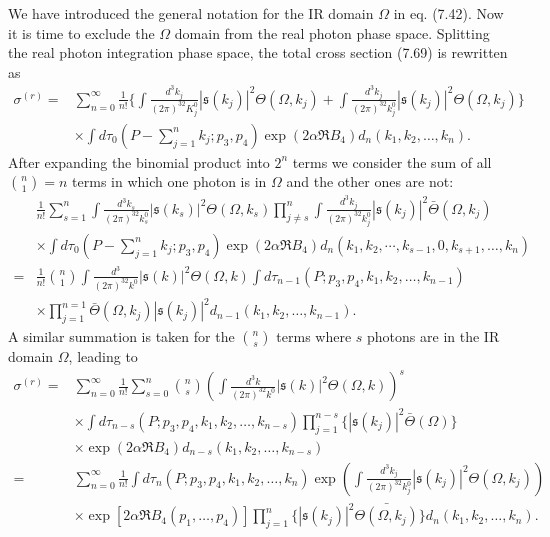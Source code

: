 We have introduced the general notation for the IR domain $\Omega$ in eq. (7.42). Now it is time to exclude the $\Omega$ domain from the real photon phase space. Splitting the real photon integration phase space, the total cross section (7.69) is rewritten as
\begin{align}
\sigma^{(r)}=&\sum_{n=0}^{\infty}\frac{1}{n!}\biggl\{ \int\frac{d^3k_j}{(2\pi)^32K_j^0}|\mathfrak{s}(k_j)|^2\Theta(\Omega,k_j)+\int\frac{d^3 k_j}{(2\pi)^32k_j^0}|\mathfrak{s}(k_j)|^2\Theta(\Omega,k_j) \biggr\}\nonumber\\
&\times\int d\tau_0\left( P-\sum^n_{j=1}k_j;p_3,p_4 \right)\exp(2\alpha\Re B_4)d_n(k_1,k_2,\ldots,k_n).
\end{align}
After expanding the binomial product into $2^n$ terms we consider the sum of all $\binom{n}{1}=n$ terms in which one photon is in $\Omega$ and the other ones are not:
\begin{align}
&\frac{1}{n!}\sum_{s=1}^{n}\int\frac{d^3k_s}{(2\pi)^32k_s^0}|\mathfrak{s}(k_s)|^2\Theta(\Omega,k_s)\prod_{j\neq s}^{n}\int\frac{d^3k_j}{(2\pi)^32k^0_j}|\mathfrak{s}(k_j)|^2\bar{\Theta}(\Omega,k_j)\nonumber\\
&\times\int d\tau_0\left( P-\sum_{j=1}^{n}k_j;p_3,p_4 \right)\exp(2\alpha\Re B_4)d_n(k_1,k_2,\cdots,k_{s-1},0,k_{s+1},\ldots,k_n)\nonumber\\
=&\frac{1}{n!}\binom{n}{1}\int\frac{d^3}{(2\pi)^32k^0}|\mathfrak{s}(k)|^2\Theta(\Omega,k)\int d\tau_{n-1}(P;p_3,p_4,k_1,k_2,\ldots,k_{n-1})\nonumber\\
&\times\prod_{j=1}^{n=1}\bar{\Theta}(\Omega,k_j)|\mathfrak{s}(k_j)|^2d_{n-1}(k_1,k_2,\ldots,k_{n-1}).
\end{align}
A similar summation is taken for the $\binom{n}{s}$ terms where $s$ photons are in the IR domain $\Omega$, leading to 
\begin{align}
\sigma^{(r)}=&\sum_{n=0}^{\infty}\frac{1}{n!}\sum_{s=0}^{n}\binom{n}{s}\left( \int\frac{d^3k}{(2\pi)^32k^0}|\mathfrak{s}(k)|^2\Theta(\Omega,k) \right)^s\nonumber\\
&\times\int d\tau_{n-s}(P;p_3,p_4,k_1,k_2,\ldots,k_{n-s})\prod_{j=1}^{n-s}\{|\mathfrak{s}(k_j)|^2\bar{\Theta}(\Omega)\}\nonumber\\
&\times\exp(2\alpha\Re B_4)d_{n-s}(k_1,k_2,\ldots,k_{n-s})\nonumber\\
=&\sum_{n=0}^{\infty}\frac{1}{n!}\int d\tau_n(P;p_3,p_4,k_1,k_2,\ldots,k_n)\exp\left(\int\frac{d^3 k_j}{(2\pi)^32k^0_j}|\mathfrak{s}(k_j)|^2\Theta(\Omega,k_j)\right)\nonumber\\
&\times\exp[2\alpha\Re B_4(p_1,\ldots,p_4)]\prod_{j=1}^{n}\{|\mathfrak{s}(k_j)|^2\bar{\Theta(\Omega,k_j)}\}d_n(k_1,k_2,\ldots,k_n).
\end{align}
